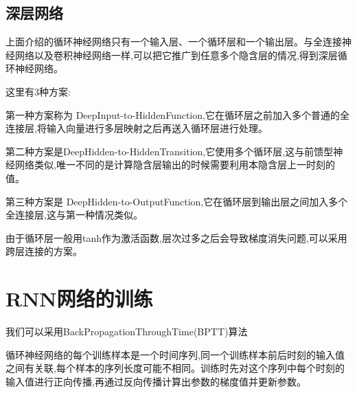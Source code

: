 \documentclass{article}
\begin{document}
\subsection{深层网络}
上面介绍的循环神经网络只有一个输入层、一个循环层和一个输出层。与全连接神经网络以及卷积神经网络一样,可以把它推广到任意多个隐含层的情况,得到深层循环神经网络。\par 
这里有3种方案:\par 
第一种方案称为 Deep\quad Input-to-Hidden\quad Function,它在循环层之前加入多个普通的全连接层,将输入向量进行多层映射之后再送入循环层进行处理。\par
第二种方案是Deep\quad Hidden-to-Hidden\quad Transition,它使用多个循环层,这与前馈型神经网络类似,唯一不同的是计算隐含层输出的时候需要利用本隐含层上一时刻的值。\par 
第三种方案是 Deep\quad Hidden-to-Output\quad Function,它在循环层到输出层之间加入多个全连接层,这与第一种情况类似。\par 
由于循环层一般用tanh作为激活函数,层次过多之后会导致梯度消失问题,可以采用跨层连接的方案。

\section{RNN网络的训练}
我们可以采用Back\quad Propagation\quad Through\quad Time(BPTT)算法
\par
循环神经网络的每个训练样本是一个时间序列,同一个训练样本前后时刻的输入值之间有关联,每个样本的序列长度可能不相同。训练时先对这个序列中每个时刻的输入值进行正向传播,再通过反向传播计算出参数的梯度值并更新参数。
\end{document}
